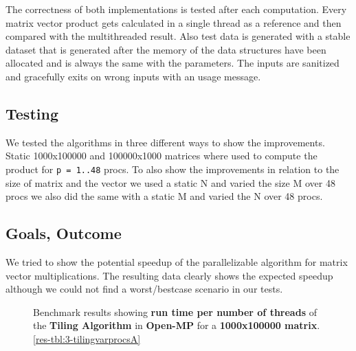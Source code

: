 The correctness of both implementations is tested after each computation.
Every matrix vector product gets calculated in a single thread as a reference and then compared with the multithreaded result.
Also test data is generated with a stable dataset that is generated after the memory of the data structures have been allocated and is always the same with the parameters.
The inputs are sanitized and gracefully exits on wrong inputs with an usage message.

\subsection{Testing}
We tested the algorithms in three different ways to show the improvements.
Static 1000x100000 and 100000x1000 matrices where used to compute the product for \texttt{p = 1..48} procs.
To also show the improvements in relation to the size of matrix and the vector we used a static N and varied the size M over 48 procs we also did the same with a static M and varied the N over 48 procs.



\subsection{Goals, Outcome}

We tried to show the potential speedup of the parallelizable algorithm for matrix vector multiplications.
The resulting data clearly shows the expected speedup although we could not find a worst/bestcase scenario in our tests.


\begin{figure}[h!]
  \centering
  \caption{Benchmark results showing \textbf{run time per number of threads} of the \textbf{Tiling Algorithm} in \textbf{Open-MP} for a \textbf{1000x100000 matrix}. \autoref{res-tbl:3-tilingvarprocsA}}
  \label{plot:3-tilingvarprocsA}
\end{figure}


